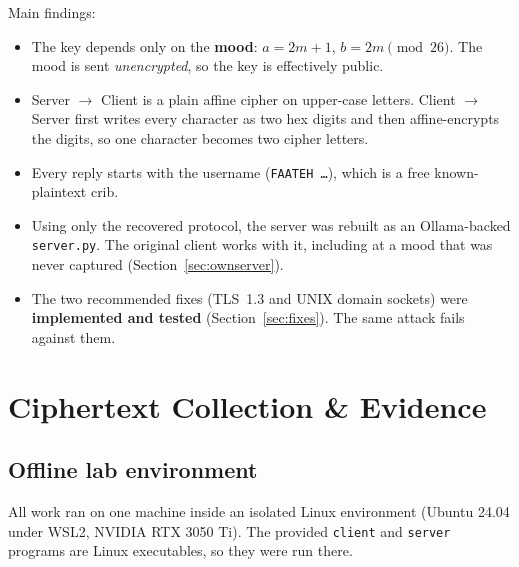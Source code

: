 \documentclass[11pt,a4paper]{article}
\DeclareRobustCommand{\_}{\textunderscore\allowbreak}  %
\newcommand{\ct}[1]{\texttt{#1}}
\newcommand{\csdir}{Client $\rightarrow$ Server}
\newcommand{\scdir}{Server $\rightarrow$ Client}
\begin{document}
Main findings:
\begin{itemize}
\item The key depends only on the \textbf{mood}: $a = 2m+1$, $b = 2m \pmod{26}$. The mood is sent \emph{unencrypted},
      so the key is effectively public.
\item \scdir{} is a plain affine cipher on upper-case letters. \csdir{} first writes every character as two hex digits and
      then affine-encrypts the digits, so one character becomes two cipher letters.
\item Every reply starts with the username (\ct{FAATEH \ldots}), which is a free known-plaintext crib.
\item Using only the recovered protocol, the server was rebuilt as an Ollama-backed \ct{server.py}. The original
      client works with it, including at a mood that was never captured (Section~\ref{sec:ownserver}).
\item The two recommended fixes (TLS~1.3 and UNIX domain sockets) were \textbf{implemented and tested}
      (Section~\ref{sec:fixes}). The same attack fails against them.
\end{itemize}

\section{Ciphertext Collection \& Evidence}

\subsection{Offline lab environment}
All work ran on one machine inside an isolated Linux environment (Ubuntu 24.04 under WSL2, NVIDIA RTX 3050 Ti).
The provided \ct{client} and \ct{server} programs are Linux executables, so they were run there.
\end{document}
